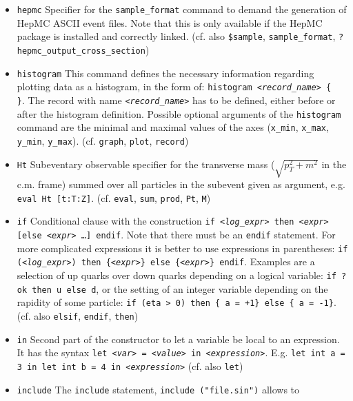 \documentclass[12pt]{book}
\newcommand{\ttt}[1]{\texttt{#1}}
\begin{document}
\begin{itemize}
\item
\ttt{hepmc} \newline
Specifier for the \ttt{sample\_format} command to demand the
generation of HepMC ASCII event files. Note that this is only
available if the HepMC package is installed and correctly
linked. (cf. also \ttt{\$sample}, \ttt{sample\_format},
\ttt{?hepmc\_output\_cross\_section})
\item
\ttt{histogram} \newline
This command defines the necessary information regarding plotting data
as a histogram, in the form of: \ttt{histogram {\em <record\_name>} \{
{\em <optional arguments>} \}}. The record with name \ttt{{\em <record\_name>}} has to be
defined, either before or after the histogram definition. Possible optional
arguments of the \ttt{histogram} command are the minimal and maximal values
of the axes (\ttt{x\_min}, \ttt{x\_max}, \ttt{y\_min}, \ttt{y\_max}).
(cf. \ttt{graph}, \ttt{plot}, \ttt{record})
\item
\ttt{Ht} \newline
Subeventary observable specifier for the transverse mass
($\sqrt{p_T^2 + m^2}$ in the c.m. frame) summed over all particles in
the subevent given as argument, e.g. \ttt{eval Ht [t:T:Z]}. (cf.
\ttt{eval}, \ttt{sum}, \ttt{prod}, \ttt{Pt}, \ttt{M})
\item
\ttt{if} \newline
Conditional clause with the construction \ttt{if {\em <log\_expr>} then
{\em <expr>} [else {\em <expr>} \ldots] endif}. Note that there must be an
\ttt{endif}  statement. For more complicated expressions it is better
to use expressions in parentheses: \ttt{if ({\em <log\_expr>}) then
\{{\em <expr>}\} else \{{\em <expr>}\} endif}. Examples are a selection of up quarks
over down quarks depending on a logical variable: \ttt{if ?ok then u
  else d}, or the setting of an integer variable depending on the
rapidity of some particle: \ttt{if (eta > 0) then \{ a = +1\} else
\{ a = -1\}}. (cf. also \ttt{elsif}, \ttt{endif}, \ttt{then})
\item
\ttt{in} \newline
Second part of the constructor to let a variable be local to an
expression. It has the syntax \ttt{let {\em <var>} = {\em <value>} in
{\em <expression>}}.  E.g. \ttt{let int a = 3 in let int b = 4 in
{\em <expression>}} (cf. also \ttt{let})
\item
\ttt{include} \newline
The \ttt{include} statement, \ttt{include ("file.sin")} allows to

\end{itemize}
\end{document}
